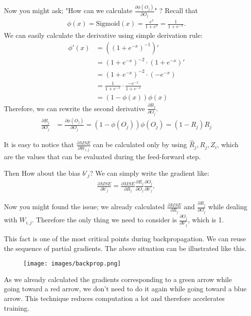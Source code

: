 \documentclass{oblivoir}
\begin{document}
Now you might ask; "How can we calculate $\frac{\partial\phi(O_j)}{\partial O_j}$" ? Recall that 
\begin{align*}
    \phi(x) = \text{Sigmoid}(x) = \frac{e^x}{1 + e^x} = \frac{1}{1 + e^{-x}}.
\end{align*}
We can easily calculate the derivative using simple derivation rule:
\begin{align*}
    \phi'(x) &= ((1 + e^{-x})^{-1})'  \\ 
    &= (1 + e^{-x})^{-2} \cdot (1 + e^{-x})'  \\
    &= (1 + e^{-x})^{-2} \cdot (-e^{-x}) \\
    &= \frac{1}{1 + e^{-x}} \cdot \frac{-e^{-x}}{1 + e^{-x}} \\
    &= (1 - \phi(x))\phi(x)
\end{align*}
Therefore, we can rewrite the second derivative $\frac{\partial R_j}{\partial O_j}$.
\begin{align*}
    \frac{\partial R_j}{\partial O_j} &= \frac{\partial\phi(O_j)}{\partial O_j} = (1- \phi(O_j))\phi(O_j) = (1-R_j)R_j
\end{align*}

It is easy to notice that $\frac{\partial MSE}{\partial W_{i,j}}$ can be calculated only by using $\hat{R}_j, R_j, Z_i$, which are the values that can be evaluated during the feed-forward step. 

Then How about the bias $b'_j$? We can simply write the gradient like:
\begin{align*}
    \frac{\partial MSE}{\partial b'_j} = \frac{\partial MSE}{\partial R_j} \frac{\partial R_j}{\partial O_j} \frac{\partial O_j}{\partial b'_j},
\end{align*}

Now you might found the issue; we already calculated $\frac{\partial MSE}{\partial R_j}$ and $ \frac{\partial R_j}{\partial O_j}$ while dealing with $W_{i,j}$. Therefore the only thing we need to consider is $\frac{\partial O_j}{\partial b'_j}$, which is 1. 

This fact is one of the most critical points during backpropagation. We can reuse the sequence of partial gradients. The above situation can be illustrated like this. 

\begin{figure}[h]
    \centering
    \texttt{[image: images/backprop.png]}
\end{figure}

As we already calculated the gradients corresponding to a green arrow while going toward a red arrow, we don't need to do it again while going toward a blue arrow. This technique reduces computation a lot and therefore accelerates training.
\end{document}
